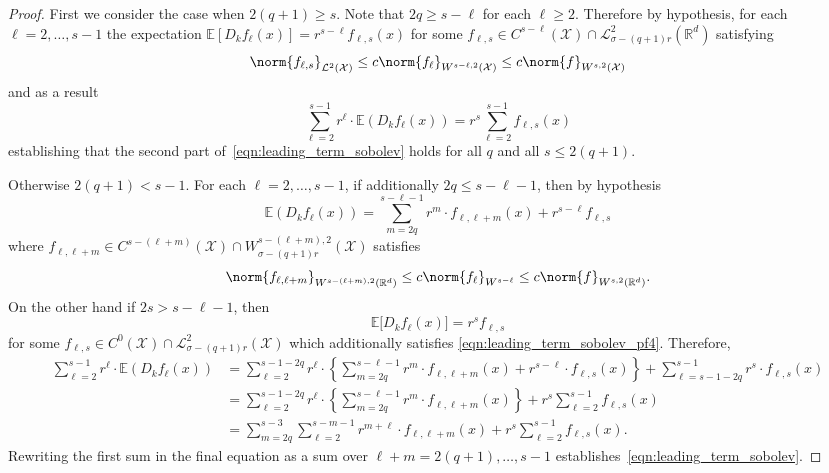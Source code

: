 \documentclass{article}
\newcommand{\Reals}{\mathbb{R}}
\newcommand{\1}{\mathbf{1}}
\newcommand{\Rd}{\Reals^d}
\newcommand{\Xset}{\mathcal{X}}
\newcommand{\Leb}{\mathcal{L}}
\newcommand{\Ebb}{\mathbb{E}}
\theoremstyle{alden}
\theoremstyle{aldenthm}
\theoremstyle{definition}
\theoremstyle{remark}
\begin{document}
\begin{proof}
	First we consider the case when $2(q + 1) \geq s$. Note that $2q \geq s - \ell$ for each $\ell \geq 2$. Therefore by hypothesis, for each $\ell = 2,\ldots,s - 1$ the expectation $\Ebb[D_kf_{\ell}(x)] = r^{s - \ell}f_{\ell,s}(x)$ for some $f_{\ell,s} \in C^{s - \ell}(\Xset) \cap \Leb_{\sigma - (q + 1)r}^2(\Rd)$ satisfying
	\begin{equation}
	\label{eqn:leading_term_sobolev_pf4}
	\norm{f_{\ell,s}}_{\Leb^2(\Xset)} \leq c\norm{f_{\ell}}_{W^{s - \ell,2}(\Xset)} \leq c\norm{f}_{W^{s,2}(\Xset)}
	\end{equation}
	and as a result
	\begin{equation*}
	\sum_{\ell = 2}^{s - 1} r^{\ell} \cdot \Ebb(D_kf_{\ell}(x)) = r^s \sum_{\ell = 2}^{s - 1} f_{\ell,s}(x)
	\end{equation*}
	establishing that the second part of~\eqref{eqn:leading_term_sobolev} holds for all $q$ and all $s \leq 2(q + 1)$. 
	
	Otherwise $2(q + 1) < s - 1$. For each $\ell = 2,\ldots, s - 1$, if additionally  $2q \leq s - \ell - 1$, then by hypothesis
	\begin{equation*}
	\Ebb(D_kf_{\ell}(x)) = \sum_{m = 2q}^{s - \ell - 1} r^{m} \cdot f_{\ell, \ell + m}(x) + r^{s - {\ell}} f_{\ell,s}
	\end{equation*}
	where $f_{\ell,\ell + m} \in C^{s - (\ell + m)}(\Xset) \cap W_{\sigma - (q + 1)r}^{s - (\ell + m),2}(\Xset)$ satisfies
	\begin{equation*}
	\norm{f_{\ell,\ell + m}}_{W^{s - (\ell + m),2}(\Rd)} \leq c\norm{f_{\ell}}_{W^{s - \ell}} \leq c\norm{f}_{W^{s,2}(\Rd)}.
	\end{equation*}
	On the other hand if $2s > s - \ell - 1$, then
	\begin{equation*}
	\Ebb\bigl[D_kf_{\ell}(x)\bigr] = r^s f_{\ell,s}
	\end{equation*}
	for some $f_{\ell,s} \in C^0(\Xset) \cap \Leb_{\sigma - (q + 1)r}^{2}(\Xset)$ which additionally satisfies \eqref{eqn:leading_term_sobolev_pf4}. Therefore,
	\begin{align*}
	\sum_{\ell = 2}^{s - 1}  r^{\ell} \cdot \Ebb(D_kf_\ell(x)) & = \sum_{\ell = 2}^{s - 1 - 2q} r^{\ell} \cdot \left\{\sum_{m = 2q}^{s - \ell - 1} r^m \cdot f_{\ell,\ell + m}(x) + r^{s - \ell} \cdot f_{\ell,s}(x) \right\} + \sum_{\ell = s - 1 - 2q}^{s - 1} r^s \cdot f_{\ell,s}(x) \\
	& = \sum_{\ell = 2}^{s - 1 - 2q} r^{\ell} \cdot \left\{\sum_{m = 2q}^{s - \ell - 1} r^m \cdot f_{\ell, \ell + m}(x)\right\}  + r^{s}\sum_{\ell = 2}^{s - 1}f_{\ell,s}(x) \\
	& = \sum_{m = 2q}^{s - 3} \sum_{\ell = 2}^{s - m - 1} r^{m + \ell} \cdot f_{\ell, \ell + m}(x) + r^{s}\sum_{\ell = 2}^{s - 1}f_{\ell,s}(x).
	\end{align*}
	Rewriting the first sum in the final equation as a sum over $\ell + m = 2(q + 1),\ldots, s - 1$ establishes~\eqref{eqn:leading_term_sobolev}.
\end{proof}
\end{document}

